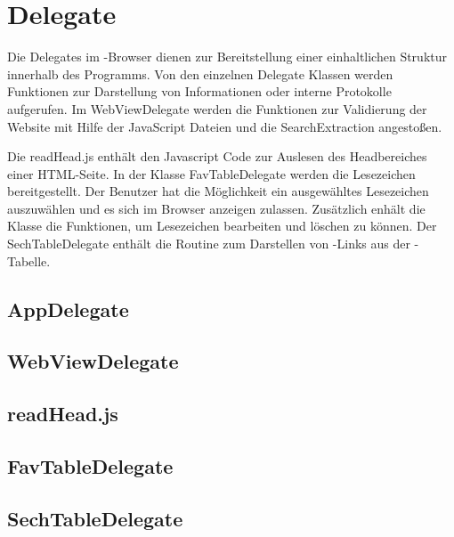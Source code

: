 
\section{Delegate}

Die Delegates im \SECH-Browser dienen zur Bereitstellung einer einhaltlichen Struktur innerhalb des Programms. Von den einzelnen Delegate Klassen werden Funktionen zur Darstellung von Informationen oder interne Protokolle aufgerufen. Im WebViewDelegate werden die Funktionen zur Validierung der Website mit Hilfe der JavaScript Dateien und die SearchExtraction angestoßen.

Die readHead.js enthält den Javascript Code zur Auslesen des Headbereiches einer HTML-Seite. In der Klasse FavTableDelegate werden die Lesezeichen bereitgestellt. Der Benutzer hat die Möglichkeit ein ausgewähltes Lesezeichen auszuwählen und es sich im Browser anzeigen zulassen. Zusätzlich enhält die Klasse die Funktionen, um Lesezeichen bearbeiten und löschen zu können. Der SechTableDelegate enthält die Routine zum Darstellen von \SEARCH-Links aus der \SECH-Tabelle. 
\subsection{AppDelegate}
\subsection{WebViewDelegate}
\subsection{readHead.js}
\subsection{FavTableDelegate}
\subsection{SechTableDelegate}

